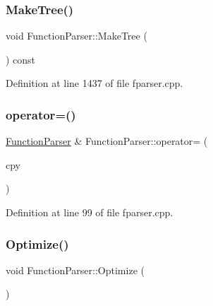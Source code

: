 \mbox{\label{class_function_parser_a8f09d400c39a72c7485d26cbff2543c9}} 
\subsubsection{\texorpdfstring{Make\+Tree()}{MakeTree()}}
{\footnotesize\ttfamily void Function\+Parser\+::\+Make\+Tree (\begin{DoxyParamCaption}\item[{void $\ast$}]{ }\end{DoxyParamCaption}) const\hspace{0.3cm}{\ttfamily [private]}}



Definition at line 1437 of file fparser.\+cpp.

\mbox{\label{class_function_parser_a316870fce14d0b1d9bc386f23115cc53}} 
\subsubsection{\texorpdfstring{operator=()}{operator=()}}
{\footnotesize\ttfamily \hyperlink{class_function_parser}{Function\+Parser} \& Function\+Parser\+::operator= (\begin{DoxyParamCaption}\item[{const \hyperlink{class_function_parser}{Function\+Parser} \&}]{cpy }\end{DoxyParamCaption})}



Definition at line 99 of file fparser.\+cpp.

\mbox{\label{class_function_parser_a5466523ee5198fb4b38461b362b1481d}} 
\subsubsection{\texorpdfstring{Optimize()}{Optimize()}}
{\footnotesize\ttfamily void Function\+Parser\+::\+Optimize (\begin{DoxyParamCaption}{ }\end{DoxyParamCaption})}



